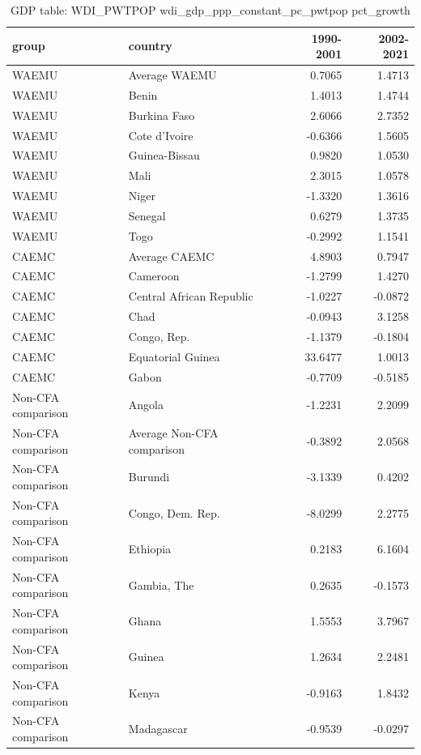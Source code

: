 \begin{table}

\caption{GDP table: WDI_PWTPOP wdi_gdp_ppp_constant_pc_pwtpop pct_growth}
\centering
\begin{tabular}[t]{llrr}
\toprule
group & country & 1990-2001 & 2002-2021\\
\midrule
WAEMU & Average WAEMU & 0.7065 & 1.4713\\
WAEMU & Benin & 1.4013 & 1.4744\\
WAEMU & Burkina Faso & 2.6066 & 2.7352\\
WAEMU & Cote d'Ivoire & -0.6366 & 1.5605\\
WAEMU & Guinea-Bissau & 0.9820 & 1.0530\\
\addlinespace
WAEMU & Mali & 2.3015 & 1.0578\\
WAEMU & Niger & -1.3320 & 1.3616\\
WAEMU & Senegal & 0.6279 & 1.3735\\
WAEMU & Togo & -0.2992 & 1.1541\\
CAEMC & Average CAEMC & 4.8903 & 0.7947\\
\addlinespace
CAEMC & Cameroon & -1.2799 & 1.4270\\
CAEMC & Central African Republic & -1.0227 & -0.0872\\
CAEMC & Chad & -0.0943 & 3.1258\\
CAEMC & Congo, Rep. & -1.1379 & -0.1804\\
CAEMC & Equatorial Guinea & 33.6477 & 1.0013\\
\addlinespace
CAEMC & Gabon & -0.7709 & -0.5185\\
Non-CFA comparison & Angola & -1.2231 & 2.2099\\
Non-CFA comparison & Average Non-CFA comparison & -0.3892 & 2.0568\\
Non-CFA comparison & Burundi & -3.1339 & 0.4202\\
Non-CFA comparison & Congo, Dem. Rep. & -8.0299 & 2.2775\\
\addlinespace
Non-CFA comparison & Ethiopia & 0.2183 & 6.1604\\
Non-CFA comparison & Gambia, The & 0.2635 & -0.1573\\
Non-CFA comparison & Ghana & 1.5553 & 3.7967\\
Non-CFA comparison & Guinea & 1.2634 & 2.2481\\
Non-CFA comparison & Kenya & -0.9163 & 1.8432\\
\addlinespace
Non-CFA comparison & Madagascar & -0.9539 & -0.0297\\

\end{tabular}
\end{table}
